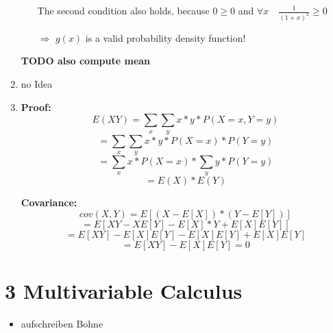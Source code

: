 \documentclass[12pt]{article}
\begin{document}
\begin{enumerate}[1)]
\begin{itemize}
                The second condition also holds, because $0 \geq 0$ and $\forall x \quad \frac{1}{(1+x)^2} \geq 0$

                $\Rightarrow$ $g(x)$ is a valid probability density function!

        \end{itemize}


        \textbf{TODO also compute mean}

    \item
        no Idea

    \item
        \textbf{Proof:}\\
        $$ E( X Y ) = \sum_x \sum_y x * y * P(X=x, Y=y) $$
        $$ = \sum_x \sum_y x * y * P(X=x) * P(Y=y)$$
        $$ = \sum_x  x * P(X=x) * \sum_y y * P(Y=y)$$
        $$ = E(X) * E(Y)$$

        \textbf{Covariance:}\\
        $$ cov(X,Y) = E[(X - E[X]) * (Y - E[Y])] $$
        $$ = E[XY - X E[Y] - E[X]*Y + E[X]E[Y]]$$
        $$ = E[XY] - E[X]E[Y] - E[X]E[Y] + E[X]E[Y]$$
        $$ = E[XY] - E[X]E[Y] = 0$$

                
\end{enumerate}



\newpage
\section*{3 Multivariable Calculus}

\begin{itemize}
    \item 
        aufschreiben Bohne
\end{itemize}
\end{document}
